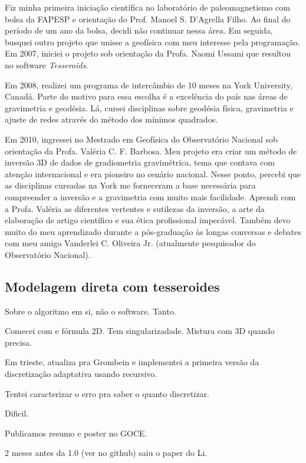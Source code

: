 Fiz minha primeira iniciação científica no laboratório de paleomagnetismo com
bolsa da FAPESP e orientação do Prof. Manoel S. D'Agrella Filho.
Ao final do período de um ano da bolsa, decidi não continuar nessa área.
Em seguida, busquei outro projeto que unisse a geofísica
com meu interesse pela programação.
Em 2007, iniciei o projeto sob orientação da
Profa. Naomi Ussami que resultou no software \textit{Tesseroids}.

Em 2008, realizei um programa de intercâmbio de 10 meses na York University,
Canadá.
Parte do motivo para essa escolha é a excelência do país nas áreas de
gravimetria e geodésia.
Lá, cursei disciplinas sobre geodésia física, gravimetria e ajuste de redes
através do método dos mínimos quadrados.

Em 2010, ingressei no Mestrado em Geofísica do Observatório Nacional sob
orientação da Profa. Valéria C. F. Barbosa.
Meu projeto era criar um método de inversão 3D de dados de gradiometria
gravimétrica, tema que contava com atenção internacional e era pioneiro no
cenário nacional.
Nesse ponto, percebi que as disciplinas cursadas na York me forneceram a base
necessária para compreender a inversão e a gravimetria com muito mais
facilidade.
Aprendi com a Profa. Valéria
as diferentes vertentes e sutilezas da inversão,
a arte da elaboração de artigo científico
e sua ética profissional impecável.
Também devo muito do meu aprendizado durante a pós-graduação às longas
conversas e debates com meu amigo Vanderlei C. Oliveira Jr. (atualmente
pesquisador do Observatório Nacional).



\subsection{Modelagem direta com tesseroides}

Sobre o algoritmo em si, não o software. Tanto.

Comecei com \citet{wild-pfeiffer2008} e fórmula 2D.
Tem singularizadade.
Mistura com 3D quando precisa.

Em trieste, atualiza pra Grombein e implementei a primeira versão da
discretização adaptativa usando recursivo.

Tentei caracterizar o erro pra saber o quanto discretizar.

Dificil.

Publicamos resumo e poster no GOCE.

2 meses antes da 1.0 (ver no github) saiu o paper do Li.


